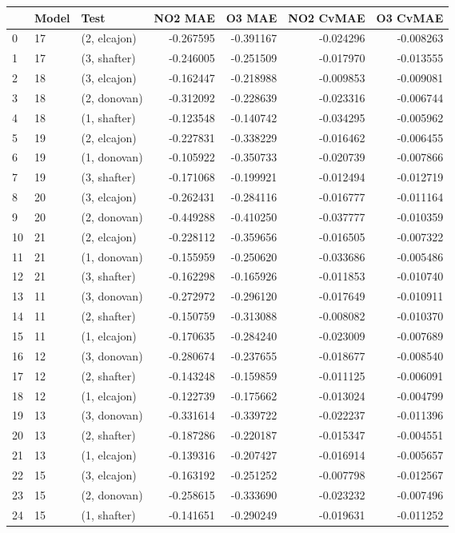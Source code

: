 \begin{tabular}{lllrrrr}
\toprule
{} & Model &          Test &   NO2 MAE &    O3 MAE &  NO2 CvMAE &  O3 CvMAE \\
\midrule
0  &    17 &  (2, elcajon) & -0.267595 & -0.391167 &  -0.024296 & -0.008263 \\
1  &    17 &  (3, shafter) & -0.246005 & -0.251509 &  -0.017970 & -0.013555 \\
2  &    18 &  (3, elcajon) & -0.162447 & -0.218988 &  -0.009853 & -0.009081 \\
3  &    18 &  (2, donovan) & -0.312092 & -0.228639 &  -0.023316 & -0.006744 \\
4  &    18 &  (1, shafter) & -0.123548 & -0.140742 &  -0.034295 & -0.005962 \\
5  &    19 &  (2, elcajon) & -0.227831 & -0.338229 &  -0.016462 & -0.006455 \\
6  &    19 &  (1, donovan) & -0.105922 & -0.350733 &  -0.020739 & -0.007866 \\
7  &    19 &  (3, shafter) & -0.171068 & -0.199921 &  -0.012494 & -0.012719 \\
8  &    20 &  (3, elcajon) & -0.262431 & -0.284116 &  -0.016777 & -0.011164 \\
9  &    20 &  (2, donovan) & -0.449288 & -0.410250 &  -0.037777 & -0.010359 \\
10 &    21 &  (2, elcajon) & -0.228112 & -0.359656 &  -0.016505 & -0.007322 \\
11 &    21 &  (1, donovan) & -0.155959 & -0.250620 &  -0.033686 & -0.005486 \\
12 &    21 &  (3, shafter) & -0.162298 & -0.165926 &  -0.011853 & -0.010740 \\
13 &    11 &  (3, donovan) & -0.272972 & -0.296120 &  -0.017649 & -0.010911 \\
14 &    11 &  (2, shafter) & -0.150759 & -0.313088 &  -0.008082 & -0.010370 \\
15 &    11 &  (1, elcajon) & -0.170635 & -0.284240 &  -0.023009 & -0.007689 \\
16 &    12 &  (3, donovan) & -0.280674 & -0.237655 &  -0.018677 & -0.008540 \\
17 &    12 &  (2, shafter) & -0.143248 & -0.159859 &  -0.011125 & -0.006091 \\
18 &    12 &  (1, elcajon) & -0.122739 & -0.175662 &  -0.013024 & -0.004799 \\
19 &    13 &  (3, donovan) & -0.331614 & -0.339722 &  -0.022237 & -0.011396 \\
20 &    13 &  (2, shafter) & -0.187286 & -0.220187 &  -0.015347 & -0.004551 \\
21 &    13 &  (1, elcajon) & -0.139316 & -0.207427 &  -0.016914 & -0.005657 \\
22 &    15 &  (3, elcajon) & -0.163192 & -0.251252 &  -0.007798 & -0.012567 \\
23 &    15 &  (2, donovan) & -0.258615 & -0.333690 &  -0.023232 & -0.007496 \\
24 &    15 &  (1, shafter) & -0.141651 & -0.290249 &  -0.019631 & -0.011252 \\
\bottomrule
\end{tabular}
